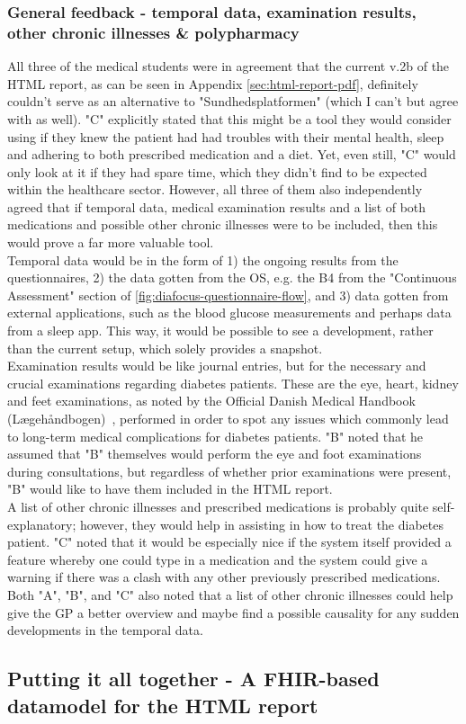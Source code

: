 \subsubsection*{General feedback - temporal data, examination results, other chronic illnesses \& polypharmacy}
All three of the medical students were in agreement that the current v.2b of the HTML report, as can be seen in Appendix \autoref{sec:html-report-pdf}, definitely couldn't serve as an alternative to "Sundhedsplatformen" (which I can't but agree with as well). "C" explicitly stated that this might be a tool they would consider using if they knew the patient had had troubles with their mental health, sleep and adhering to both prescribed medication and a diet. Yet, even still, "C" would only look at it if they had spare time, which they didn't find to be expected within the healthcare sector. However, all three of them also independently agreed that if temporal data, medical examination results and a list of both medications and possible other chronic illnesses were to be included, then this would prove a far more valuable tool.
\\
Temporal data would be in the form of 1) the ongoing results from the questionnaires, 2) the data gotten from the OS, e.g. the B4 from the "Continuous Assessment" section of \autoref{fig:diafocus-questionnaire-flow}, and 3) data gotten from external applications, such as the blood glucose measurements and perhaps data from a sleep app. This way, it would be possible to see a development, rather than the current setup, which solely provides a snapshot. 
\\
Examination results would be like journal entries, but for the necessary and crucial examinations regarding diabetes patients. These are the eye, heart, kidney and feet examinations, as noted by the Official Danish Medical Handbook (Lægehåndbogen)~\cite{SundhedDK-diabetes}, performed in order to spot any issues which commonly lead to long-term medical complications for diabetes patients. "B" noted that he assumed that "B" themselves would perform the eye and foot examinations during consultations, but regardless of whether prior examinations were present, "B" would like to have them included in the HTML report. 
\\
A list of other chronic illnesses and prescribed medications is probably quite self-explanatory; however, they would help in assisting in how to treat the diabetes patient. "C" noted that it would be especially nice if the system itself provided a feature whereby one could type in a medication and the system could give a warning if there was a clash with any other previously prescribed medications. Both "A", "B", and "C" also noted that a list of other chronic illnesses could help give the GP a better overview and maybe find a possible causality for any sudden developments in the temporal data.

\subsection{Putting it all together - A FHIR-based datamodel for the HTML report}
